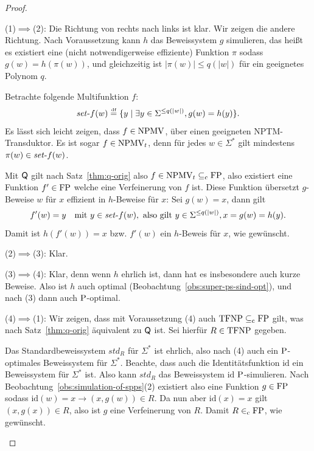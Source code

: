 \begin{proof}
    \begin{prooflist}
    \item (1)$\implies$(2): Die Richtung von rechts nach links ist klar. Wir zeigen die andere Richtung. Nach Voraussetzung kann $h$ das Beweissystem $g$ simulieren, das heißt es existiert eine (nicht notwendigerweise effiziente) Funktion $\pi$ sodass $g(w)=h(\pi(w))$, und gleichzeitig ist $|\pi(w)|\leq q(|w|)$ für ein geeignetes Polynom $q$.

Betrachte folgende Multifunktion $f$:
\[ \fset{}f(w) \defeq  \{ y \mid \exists y\in\Sigma^{\leq q(|w|)}, g(w)=h(y) \}. \]
Es lässt sich leicht zeigen, dass $f\in\NPMV$, über einen geeigneten NPTM-Transduktor. 
Es ist sogar $f\in\NPMV_t$, denn für jedes $w\in\Sigma^*$ gilt mindestens $\pi(w)\in \fset{}f(w)$.

Mit $\hQ$ gilt nach Satz~\ref{thm:q-orig} also $f\in\NPMV_t\subseteqc \FP$, also existiert eine Funktion $f'\in\FP$ welche eine Verfeinerung von $f$ ist. Diese Funktion übersetzt $g$-Beweise $w$ für $x$ effizient in $h$-Beweise für $x$: 
Sei $g(w)=x$, dann gilt
\[ f'(w) = y \quad\text{mit } y\in\fset{}f(w), \text{ also gilt } y\in\Sigma^{\leq q(|w|)}, x=g(w)=h(y). \]
Damit ist $h(f'(w))=x$ bzw. $f'(w)$ ein $h$-Beweis für $x$, wie gewünscht.

\item (2)$\implies$(3): Klar.

\item (3)$\implies$(4): Klar, denn wenn $h$ ehrlich ist, dann hat es insbesondere auch kurze Beweise. Also ist $h$ auch optimal (Beobachtung~\ref{obs:super-ps-sind-opt}), und nach (3) dann auch $\P$-optimal.

\item (4)$\implies$(1): Wir zeigen, dass mit Voraussetzung (4) auch $\TFNP\subseteqc \FP$ gilt, was nach Satz~\ref{thm:q-orig} äquivalent zu $\hQ$ ist. Sei hierfür $R\in\TFNP$ gegeben.

    Das Standardbeweissystem $\mathit{std}_R$ für $\Sigma^*$ ist ehrlich, also nach (4) auch ein $\P$-optimales Beweissystem für $\Sigma^*$. Beachte, dass auch die Identitätsfunktion $\mathrm{id}$ ein Beweissystem für $\Sigma^*$ ist. Also kann $\mathit{std}_R$ das Beweissystem $\mathrm{id}$ $\P$-simulieren. Nach Beobachtung~\ref{obs:simulation-of-spps}(2) existiert also eine Funktion $g\in\FP$ sodass $\mathrm{id}(w)=x\rightarrow (x, g(w))\in R$. Da nun aber $\mathrm{id}(x)=x$ gilt $(x, g(x))\in R$, also ist $g$ eine Verfeinerung von $R$. Damit $R\inc\FP$, wie gewünscht.
    \end{prooflist}
\end{proof}

